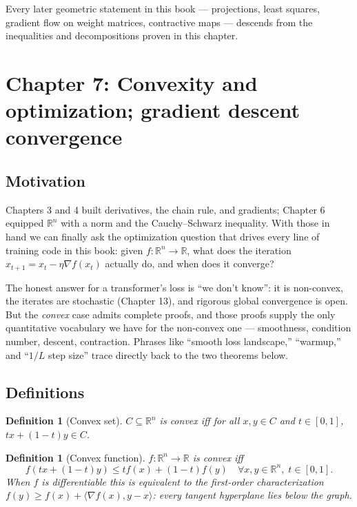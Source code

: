\documentclass[11pt]{article}
\newtheorem{definition}[theorem]{Definition}
\theoremstyle{remark}
\begin{document}
Every later geometric statement in this book --- projections, least squares, gradient flow on weight matrices, contractive maps --- descends from the inequalities and decompositions proven in this chapter.


\section*{Chapter 7: Convexity and optimization; gradient descent convergence}

\subsection*{Motivation}

Chapters 3 and 4 built derivatives, the chain rule, and gradients; Chapter 6 equipped $\mathbb{R}^n$ with a norm and the Cauchy--Schwarz inequality. With those in hand we can finally ask the optimization question that drives every line of training code in this book: given $f : \mathbb{R}^n \to \mathbb{R}$, what does the iteration $x_{t+1} = x_t - \eta \nabla f(x_t)$ actually do, and when does it converge?

The honest answer for a transformer's loss is ``we don't know'': it is non-convex, the iterates are stochastic (Chapter 13), and rigorous global convergence is open. But the \emph{convex} case admits complete proofs, and those proofs supply the only quantitative vocabulary we have for the non-convex one --- smoothness, condition number, descent, contraction. Phrases like ``smooth loss landscape,'' ``warmup,'' and ``$1/L$ step size'' trace directly back to the two theorems below.

\subsection*{Definitions}

\begin{definition}[Convex set]
$C \subseteq \mathbb{R}^n$ is \emph{convex} iff for all $x, y \in C$ and $t \in [0,1]$, $tx + (1-t)y \in C$.
\end{definition}

\begin{definition}[Convex function]
$f : \mathbb{R}^n \to \mathbb{R}$ is \emph{convex} iff
\[
f(tx + (1-t)y) \leq t f(x) + (1-t) f(y) \quad \forall x, y \in \mathbb{R}^n,\; t \in [0,1].
\]
When $f$ is differentiable this is equivalent to the \emph{first-order} characterization $f(y) \geq f(x) + \langle \nabla f(x), y - x \rangle$: every tangent hyperplane lies below the graph.
\end{definition}
\end{document}
